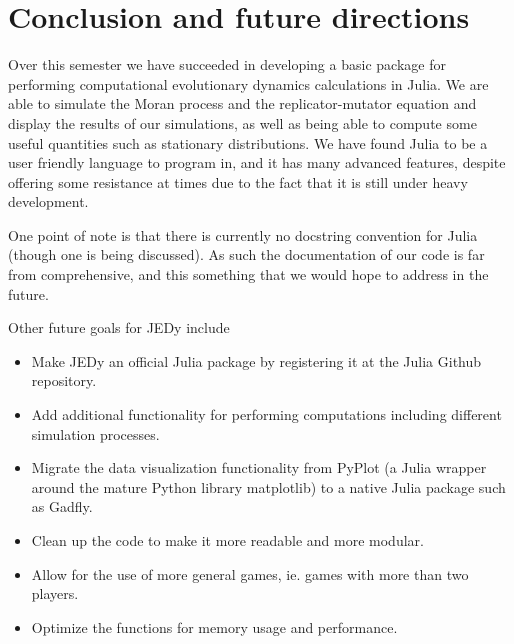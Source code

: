 \section{Conclusion and future directions}

Over this semester we have succeeded in developing a basic package for performing computational evolutionary dynamics calculations in Julia.
We are able to simulate the Moran process and the replicator-mutator equation and display the results of our simulations, as well as being able to compute some useful quantities such as stationary distributions.
We have found Julia to be a user friendly language to program in, and it has many advanced features, despite offering some resistance at times due to the fact that it is still under heavy development.

One point of note is that there is currently no docstring convention for Julia (though one is being discussed).
As such the documentation of our code is far from comprehensive, and this something that we would hope to address in the future.

Other future goals for JEDy include

\begin{itemize}
    \item Make JEDy an official Julia package by registering it at the Julia Github repository.
    \item Add additional functionality for performing computations including different simulation processes.
    \item Migrate the data visualization functionality from PyPlot (a Julia wrapper around the mature Python library matplotlib) to a native Julia package such as Gadfly.
    \item Clean up the code to make it more readable and more modular.
    \item Allow for the use of more general games, ie. games with more than two players.
    \item Optimize the functions for memory usage and performance.
\end{itemize}
